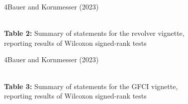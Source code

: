 \documentclass[xcolor=table,9pt,aspectratio=169]{beamer}
\begin{document}
\begin{frame}{\vspace*{10mm}4\hspace*{1em}Bauer and Kornmesser (2023)}
\vspace*{-5mm}
\begin{center}
   \\
   {\footnotesize\textbf{Table 2:} Summary of statements for the revolver vignette,\\reporting results of Wilcoxon signed-rank tests}
\end{center}
\end{frame}


\begin{frame}{\vspace*{10mm}4\hspace*{1em}Bauer and Kornmesser (2023)}
\vspace*{-5mm}
\begin{center}
   \\
   {\footnotesize\textbf{Table 3:} Summary of statements for the GFCI vignette,\\reporting results of Wilcoxon signed-rank tests}
\end{center}
\end{frame}
\end{document}
